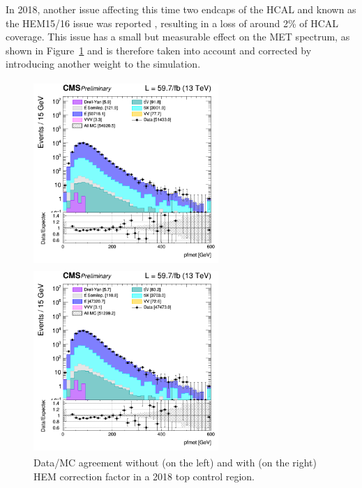 \documentclass[a4paper, 10pt, openright]{report}
\begin{document}
In 2018, another issue affecting this time two endcaps of the \ac{HCAL} and known as the HEM15/16 issue was reported \cite{HEM}, resulting in a loss of around 2\% of \ac{HCAL} coverage. This issue has a small but measurable effect on the \ac{MET} spectrum, as shown in Figure~\ref{fig:HEM} and is therefore taken into account and corrected by introducing another weight to the simulation.

\begin{figure}[htbp]
\begin{center}
\begin{minipage}[b]{.48\textwidth}
\includegraphics[width=7cm, height=7cm]{figs/log_cratio_ttbarCR_df_METcorrected_pt.png}
\end{minipage} \hfill
\begin{minipage}[b]{.48\textwidth}
\includegraphics[width=7cm, height=7cm]{figs/log_cratio_ttbarCR_df_METcorrected_pt_withHEM.png}
\end{minipage} \hfill
\caption{Data/\ac{MC} agreement without (on the left) and with (on the right) HEM correction factor in a 2018 top control region.}
\label{fig:HEM}
\end{center}
\end{figure}
\end{document}
